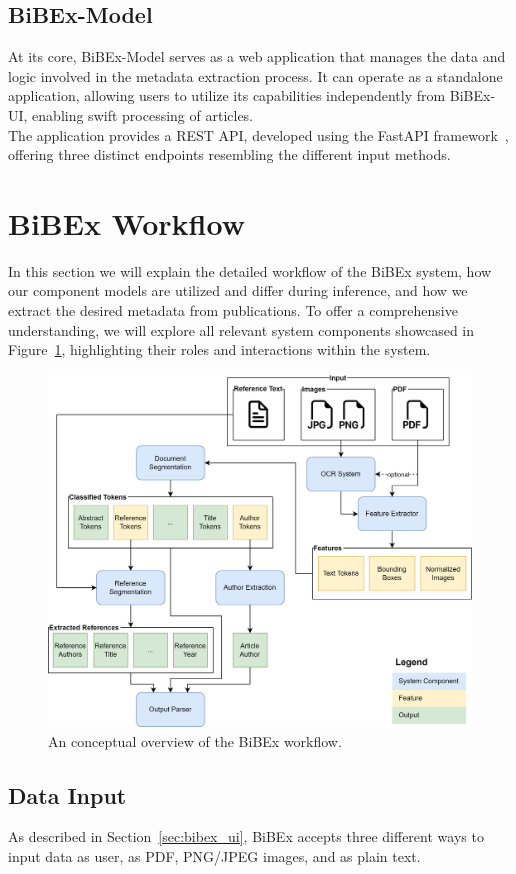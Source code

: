 \subsection{BiBEx-Model}

At its core, BiBEx-Model serves as a web application that manages the data and logic involved in the metadata extraction process. It can operate as a standalone application, allowing users to utilize its capabilities independently from BiBEx-UI, enabling swift processing of articles.\\
The application provides a REST API, developed using the FastAPI framework~\cite{fastapi}, offering three distinct endpoints resembling the different input methods.

\section{BiBEx Workflow}\label{sec:bibex_workflow}
In this section we will explain the detailed workflow of the BiBEx system, how our component models are utilized and differ during inference, and how we extract the desired metadata from publications. To offer a comprehensive understanding, we will explore all relevant system components showcased in Figure~\ref{fig:bibex_workflow}, highlighting their roles and interactions within the system.

\begin{figure}[!ht]
	\centering
	\includegraphics[width=0.7\linewidth]{images/bibex_architecture.png}
	\caption{An conceptual overview of the BiBEx workflow.}
	\label{fig:bibex_workflow}
\end{figure}

\subsection{Data Input}
As described in Section~\ref{sec:bibex_ui}, BiBEx accepts three different ways to input data as user, as PDF, PNG/JPEG images, and as plain text.

